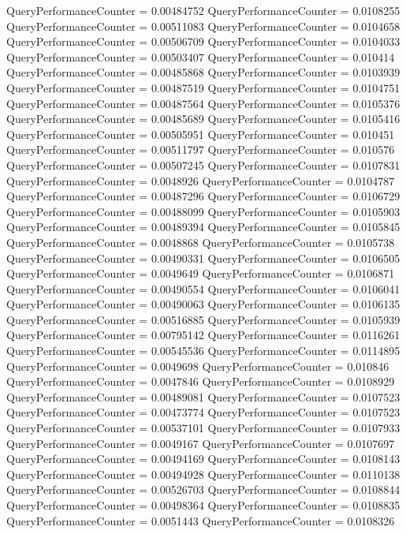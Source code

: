 \documentclass[9pt]{article}
\theoremstyle{plain}
\theoremstyle{definition}
\theoremstyle{remark}
\numberwithin{equation}{section}
\begin{document}
QueryPerformanceCounter  =  0.00484752
QueryPerformanceCounter  =  0.0108255
QueryPerformanceCounter  =  0.00511083
QueryPerformanceCounter  =  0.0104658
QueryPerformanceCounter  =  0.00506709
QueryPerformanceCounter  =  0.0104033
QueryPerformanceCounter  =  0.00503407
QueryPerformanceCounter  =  0.010414
QueryPerformanceCounter  =  0.00485868
QueryPerformanceCounter  =  0.0103939
QueryPerformanceCounter  =  0.00487519
QueryPerformanceCounter  =  0.0104751
QueryPerformanceCounter  =  0.00487564
QueryPerformanceCounter  =  0.0105376
QueryPerformanceCounter  =  0.00485689
QueryPerformanceCounter  =  0.0105416
QueryPerformanceCounter  =  0.00505951
QueryPerformanceCounter  =  0.010451
QueryPerformanceCounter  =  0.00511797
QueryPerformanceCounter  =  0.010576
QueryPerformanceCounter  =  0.00507245
QueryPerformanceCounter  =  0.0107831
QueryPerformanceCounter  =  0.0048926
QueryPerformanceCounter  =  0.0104787
QueryPerformanceCounter  =  0.00487296
QueryPerformanceCounter  =  0.0106729
QueryPerformanceCounter  =  0.00488099
QueryPerformanceCounter  =  0.0105903
QueryPerformanceCounter  =  0.00489394
QueryPerformanceCounter  =  0.0105845
QueryPerformanceCounter  =  0.0048868
QueryPerformanceCounter  =  0.0105738
QueryPerformanceCounter  =  0.00490331
QueryPerformanceCounter  =  0.0106505
QueryPerformanceCounter  =  0.0049649
QueryPerformanceCounter  =  0.0106871
QueryPerformanceCounter  =  0.00490554
QueryPerformanceCounter  =  0.0106041
QueryPerformanceCounter  =  0.00490063
QueryPerformanceCounter  =  0.0106135
QueryPerformanceCounter  =  0.00516885
QueryPerformanceCounter  =  0.0105939
QueryPerformanceCounter  =  0.00795142
QueryPerformanceCounter  =  0.0116261
QueryPerformanceCounter  =  0.00545536
QueryPerformanceCounter  =  0.0114895
QueryPerformanceCounter  =  0.0049698
QueryPerformanceCounter  =  0.010846
QueryPerformanceCounter  =  0.0047846
QueryPerformanceCounter  =  0.0108929
QueryPerformanceCounter  =  0.00489081
QueryPerformanceCounter  =  0.0107523
QueryPerformanceCounter  =  0.00473774
QueryPerformanceCounter  =  0.0107523
QueryPerformanceCounter  =  0.00537101
QueryPerformanceCounter  =  0.0107933
QueryPerformanceCounter  =  0.0049167
QueryPerformanceCounter  =  0.0107697
QueryPerformanceCounter  =  0.00494169
QueryPerformanceCounter  =  0.0108143
QueryPerformanceCounter  =  0.00494928
QueryPerformanceCounter  =  0.0110138
QueryPerformanceCounter  =  0.00526703
QueryPerformanceCounter  =  0.0108844
QueryPerformanceCounter  =  0.00498364
QueryPerformanceCounter  =  0.0108835
QueryPerformanceCounter  =  0.0051443
QueryPerformanceCounter  =  0.0108326
\end{document}
